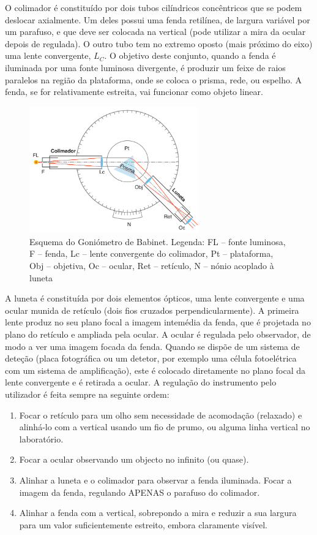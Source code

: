 \documentclass[a4paper,12pt]{article}      %
\begin{document}
O colimador é constituído por dois tubos cilíndricos concêntricos que se podem deslocar axialmente. Um deles possui uma fenda retilínea, de largura variável por um parafuso, e que deve ser colocada na vertical (pode utilizar a mira da ocular depois de regulada). O outro tubo tem no extremo oposto (mais próximo do eixo) uma lente convergente, $L_C$. O objetivo deste conjunto, quando a fenda é iluminada por uma fonte luminosa divergente, é produzir um feixe de raios paralelos na região da plataforma, onde se coloca o prisma, rede, ou espelho. A fenda, se for relativamente estreita, vai funcionar como objeto linear.

\begin{figure}[!htb]  
	\centering 
	\includegraphics[width=0.65\textwidth]{Babinet}
	\caption{Esquema do Goniómetro de Babinet. Legenda: FL -- fonte luminosa, F -- fenda, Lc -- lente convergente do colimador, Pt -- plataforma, Obj -- objetiva, Oc -- ocular, Ret -- retículo, N -- nónio acoplado à luneta\label{fig:babinet}} 
\end{figure}

A luneta é constituída por dois elementos ópticos, uma lente convergente e uma ocular munida de retículo (dois fios cruzados perpendicularmente). A primeira lente produz no seu plano focal a imagem intemédia da fenda, que é projetada no plano do retículo e ampliada pela ocular. A ocular é regulada pelo observador, de modo a ver uma imagem focada da fenda. Quando se dispõe de um sistema de deteção (placa fotográfica ou um detetor, por exemplo uma célula fotoelétrica com um sistema de amplificação), este é colocado diretamente no plano focal da lente convergente e é retirada a ocular.
A regulação do instrumento pelo utilizador é feita sempre na seguinte ordem:
\begin{enumerate}
\item Focar  o retículo para um olho sem necessidade de acomodação (relaxado) e alinhá-lo com a vertical usando um fio de prumo, ou alguma linha vertical no laboratório.
\item Focar a ocular observando um objecto no infinito (ou quase).
\item Alinhar a luneta e o colimador para observar a fenda iluminada. Focar a imagem da fenda, regulando APENAS o parafuso do colimador.
\item Alinhar a fenda com a vertical, sobrepondo a mira e reduzir a sua largura para um valor suficientemente estreito, embora claramente visível.
\end{enumerate}
\end{document}
